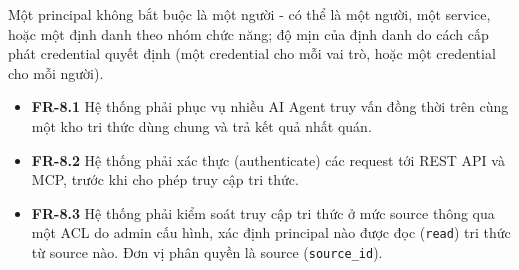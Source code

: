 Một principal không bắt buộc là một người - có thể là một người, một service, hoặc một định danh theo nhóm chức năng; độ mịn của định danh do cách cấp phát credential quyết định (một credential cho mỗi vai trò, hoặc một credential cho mỗi người).

\begin{itemize}
  \item \textbf{FR-8.1} Hệ thống phải phục vụ nhiều AI Agent truy vấn đồng thời trên cùng một kho tri thức dùng chung và trả kết quả nhất quán.
  \item \textbf{FR-8.2} Hệ thống phải xác thực (authenticate) các request tới REST API và MCP, trước khi cho phép truy cập tri thức.
  \item \textbf{FR-8.3} Hệ thống phải kiểm soát truy cập tri thức ở mức source thông qua một ACL do admin cấu hình, xác định principal nào được đọc (\texttt{read}) tri thức từ source nào. Đơn vị phân quyền là source (\texttt{source\_id}).
      

\end{itemize}

